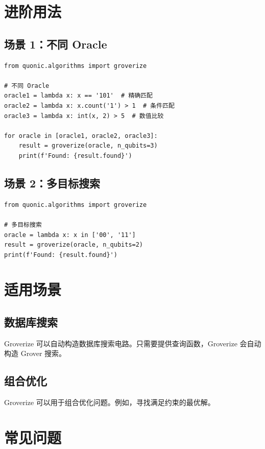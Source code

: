 \documentclass[12pt,a4paper]{article}
\begin{document}
\section{进阶用法}

\subsection{场景 1：不同 Oracle}

\begin{verbatim}
from quonic.algorithms import groverize

# 不同 Oracle
oracle1 = lambda x: x == '101'  # 精确匹配
oracle2 = lambda x: x.count('1') > 1  # 条件匹配
oracle3 = lambda x: int(x, 2) > 5  # 数值比较

for oracle in [oracle1, oracle2, oracle3]:
    result = groverize(oracle, n_qubits=3)
    print(f'Found: {result.found}')
\end{verbatim}

\subsection{场景 2：多目标搜索}

\begin{verbatim}
from quonic.algorithms import groverize

# 多目标搜索
oracle = lambda x: x in ['00', '11']
result = groverize(oracle, n_qubits=2)
print(f'Found: {result.found}')
\end{verbatim}

\section{适用场景}

\subsection{数据库搜索}

Groverize 可以自动构造数据库搜索电路。只需要提供查询函数，Groverize 会自动构造 Grover 搜索。

\subsection{组合优化}

Groverize 可以用于组合优化问题。例如，寻找满足约束的最优解。

\section{常见问题}
\end{document}
